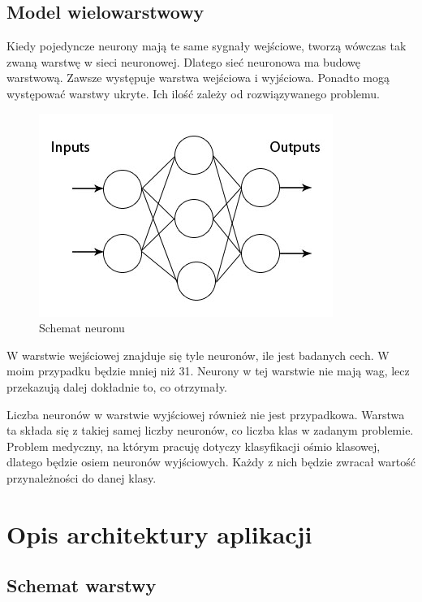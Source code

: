 \documentclass{report}
\begin{document}


    \section{Model wielowarstwowy}

    Kiedy pojedyncze neurony mają te same sygnały wejściowe, tworzą wówczas tak zwaną warstwę w sieci neuronowej.
    Dlatego sieć neuronowa ma budowę warstwową.
    Zawsze występuje warstwa wejściowa i wyjściowa.
    Ponadto mogą występować warstwy ukryte.
    Ich ilość zależy od rozwiązywanego problemu.

    \begin{figure}[H]
        \centering
        \includegraphics[scale=0.9]{./img/mlp.jpg}
        \caption{Schemat neuronu}
    \end{figure}

    W warstwie wejściowej znajduje się tyle neuronów, ile jest badanych cech.
    W moim przypadku będzie mniej niż 31.
    Neurony w tej warstwie nie mają wag, lecz przekazują dalej dokładnie to, co otrzymały.

    Liczba neuronów w warstwie wyjściowej również nie jest przypadkowa.
    Warstwa ta składa się z takiej samej liczby neuronów, co liczba klas w zadanym problemie.
    Problem medyczny, na którym pracuję dotyczy klasyfikacji ośmio klasowej, dlatego będzie osiem neuronów wyjściowych.
    Każdy z nich będzie zwracał wartość przynależności do danej klasy.




    \chapter{Opis architektury aplikacji}

    \section{Schemat warstwy}
\end{document}
